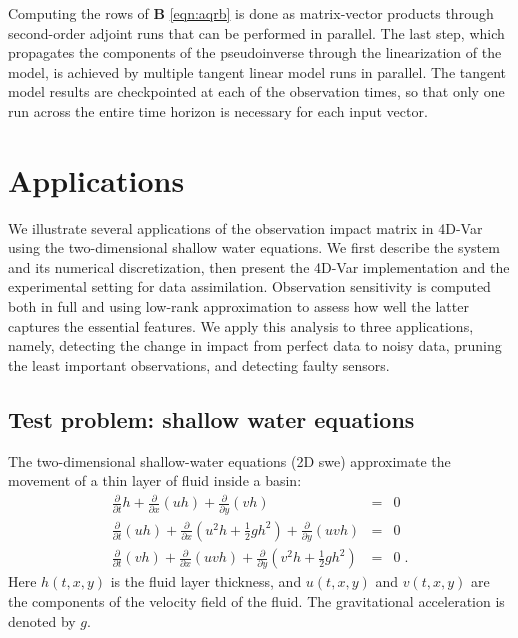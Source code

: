 \documentclass[final,sort&compress]{elsarticle}
\newcommand{\B}{\mathbf{B}}
\begin{document}
Computing the rows of $\B$ \eqref{eqn:aqrb} is done as matrix-vector products through second-order adjoint runs that can be performed in parallel.
The last step, which propagates the components of the pseudoinverse through the linearization of the model,
is achieved by multiple tangent linear model runs in parallel. 
The tangent model results are checkpointed at each of the observation times,
so that only one run across the entire time horizon is necessary for each input vector.

\section{Applications}\label{sec:results}


We illustrate several applications of the observation impact matrix in 4D-Var using the two-dimensional shallow water equations.
We first describe the system and its numerical discretization, then 
present the 4D-Var implementation and the experimental setting for data assimilation.
Observation sensitivity is computed both in full and using low-rank approximation to assess how well the latter captures the essential features.
We apply this analysis to three applications, namely, detecting the change in impact from perfect data to noisy data, 
pruning the least important observations, and detecting faulty sensors.


\subsection{Test problem: shallow water equations}


The two-dimensional shallow-water equations (2D {\sc swe}) \cite{CPA:CPA3160210103} approximate the movement of a thin layer of fluid inside a basin:
\begin{eqnarray}
 \frac{\partial}{\partial t} h + \frac{\partial}{\partial x} (uh) + \frac{\partial}{\partial y} (vh) &=& 0 \nonumber \\
 \frac{\partial}{\partial t} (uh) + \frac{\partial}{\partial x} \left(u^2 h + \frac{1}{2} g h^2\right) + \frac{\partial}{\partial y} (u v h) &=& 0  \label{swe} \\
 \frac{\partial}{\partial t} (vh) + \frac{\partial}{\partial x} (u v h) + \frac{\partial}{\partial y} \left(v^2 h + \frac{1}{2} g h^2\right) &=& 0 \;.
\nonumber
\end{eqnarray}
Here $h(t,x,y)$ is the fluid layer thickness, and $u(t,x,y)$ and $v(t,x,y)$ are the components of 
the velocity field of the fluid. The gravitational acceleration is denoted by $g$. 
\end{document}

